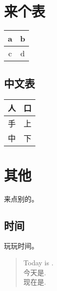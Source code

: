 \documentclass{scrartcl}
\begin{document}
\begin{CJK}{UTF8}{gbsn}
\begin{center}
	 \\
	\vspace{0.3cm}
	 \\
	\vspace{0.3cm}
\end{center}


\clearpage


\section{来个表}

\begin{tabular}{|c|c|}
	\hline
	a & b\\
	\hline
	c & d\\
	\hline
\end{tabular}

\subsection{中文表}
\begin{tabular}{|c|c|}
	\hline
	人 & 口\\
	\hline
	手 & 上\\
	\hline
	中 & 下\\
	\hline
\end{tabular}

\section{其他}
来点别的。

\subsection{时间}
玩玩时间。\\

\begin{minipage}[h]{0.4\linewidth}
\begin{flushleft}

\begin{verse}
Today is \todaysname. \\
今天是\todaysname. \\
现在是\thistime. \\
\end{verse}


\end{flushleft}
\end{minipage}
\end{CJK}
\end{document}
